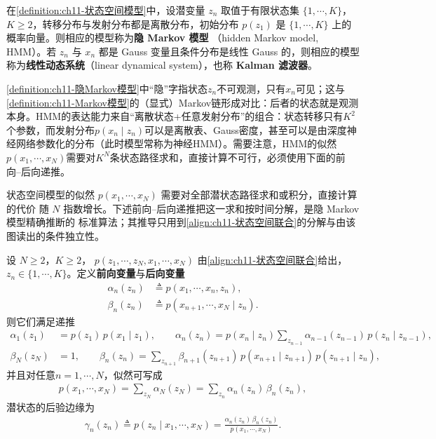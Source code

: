 \documentclass[../../main.tex]{subfiles}
\begin{document}
\begin{definition}[隐 Markov 模型]\label{definition:ch11-隐Markov模型}
在\cref{definition:ch11-状态空间模型}中，设潜变量 $z_n$ 取值于有限状态集
$\{1,\cdots,K\}$，$K\geqslant2$，转移分布与发射分布都是离散分布，初始分布
$p(z_1)$ 是 $\{1,\cdots,K\}$ 上的概率向量。则相应的模型称为\textbf{隐 Markov 模型}
（hidden Markov model, HMM）。若 $z_n$ 与 $x_n$ 都是 Gauss 变量且条件分布是线性
Gauss 的，则相应的模型称为\textbf{线性动态系统}（linear dynamical system），也称
\textbf{Kalman 滤波器}。
\end{definition}

\begin{remark}
\cref{definition:ch11-隐Markov模型}中“隐”字指状态$z_n$不可观测，只有$x_n$可见；这与\cref{definition:ch11-Markov模型}的（显式）Markov链形成对比：后者的状态就是观测本身。HMM的表达能力来自“离散状态+任意发射分布”的组合：状态转移只有$K^2$个参数，而发射分布$p(x_n\mid z_n)$可以是离散表、Gauss密度，甚至可以是由深度神经网络参数化的分布（此时模型常称为神经HMM）。需要注意，HMM的似然$p(x_1,\cdots,x_N)$需要对$K^N$条状态路径求和，直接计算不可行，必须使用下面的前向–后向递推。
\end{remark}

\begin{remark}
状态空间模型的似然 $p(x_1,\cdots,x_N)$ 需要对全部潜状态路径求和或积分，直接计算的代价
随 $N$ 指数增长。下述前向--后向递推把这一求和按时间分解，是隐 Markov 模型精确推断的
标准算法；其推导只用到\eqref{align:ch11-状态空间联合}的分解与由该图读出的条件独立性。
\end{remark}

\begin{proposition}\label{proposition:ch11-前向后向}
设 $N\geqslant2$，$K\geqslant2$，
$p(z_1,\cdots,z_N,x_1,\cdots,x_N)$ 由\eqref{align:ch11-状态空间联合}给出，
$z_n\in\{1,\cdots,K\}$。定义\textbf{前向变量}与\textbf{后向变量}
\begin{align}
  \alpha_n(z_n) &\triangleq p(x_1,\cdots,x_n,z_n),\\
  \beta_n(z_n) &\triangleq p(x_{n+1},\cdots,x_N\mid z_n).
\end{align}
则它们满足递推
\begin{align}
  \alpha_1(z_1) &= p(z_1)\,p(x_1\mid z_1),\qquad
  \alpha_n(z_n) = p(x_n\mid z_n)\sum_{z_{n-1}}\alpha_{n-1}(z_{n-1})\,p(z_n\mid z_{n-1}),
  \label{align:ch11-前向递推}\\
  \beta_N(z_N) &= 1,\qquad
  \beta_n(z_n) = \sum_{z_{n+1}}\beta_{n+1}(z_{n+1})\,p(x_{n+1}\mid z_{n+1})\,p(z_{n+1}\mid z_n),
  \label{align:ch11-后向递推}
\end{align}
并且对任意$n=1,\cdots,N$，似然可写成
\begin{align}
  p(x_1,\cdots,x_N) = \sum_{z_N}\alpha_N(z_N) = \sum_{z_n}\alpha_n(z_n)\,\beta_n(z_n),
  \label{align:ch11-似然前向后向}
\end{align}
潜状态的后验边缘为
\begin{align}
  \gamma_n(z_n) \triangleq p(z_n\mid x_1,\cdots,x_N) = \frac{\alpha_n(z_n)\,\beta_n(z_n)}{p(x_1,\cdots,x_N)}.
  \label{align:ch11-后验边缘}
\end{align}
\end{proposition}
\end{document}
